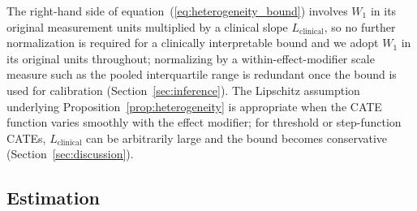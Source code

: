 \documentclass[AMA,Times1COL]{WileyNJDv5}
\begin{document}

The right-hand side of equation~(\ref{eq:heterogeneity_bound}) involves $W_1$ in its original measurement units multiplied by a clinical slope $L_{\text{clinical}}$, so no further normalization is required for a clinically interpretable bound and we adopt $W_1$ in its original units throughout; normalizing by a within-effect-modifier scale measure such as the pooled interquartile range is redundant once the bound is used for calibration (Section~\ref{sec:inference}). The Lipschitz assumption underlying Proposition~\ref{prop:heterogeneity} is appropriate when the CATE function varies smoothly with the effect modifier; for threshold or step-function CATEs, $L_{\text{clinical}}$ can be arbitrarily large and the bound becomes conservative (Section~\ref{sec:discussion}).

\subsection{Estimation}\label{sec:estimation}
\end{document}
